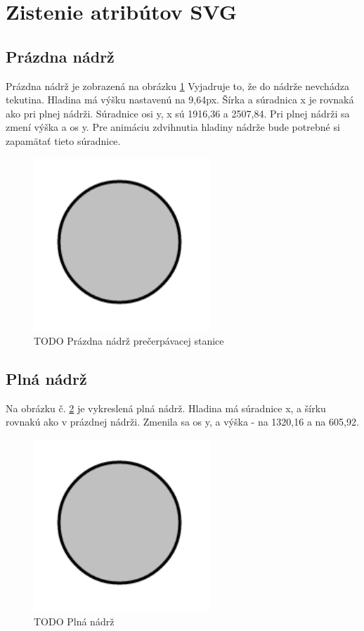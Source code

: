 \section{Zistenie atribútov SVG}

\subsection{Prázdna nádrž}
Prázdna nádrž je zobrazená na obrázku \ref{picture6}
Vyjadruje to, že do nádrže nevchádza tekutina. Hladina má výšku nastavenú na 9,64px. Šírka a súradnica x je rovnaká ako pri plnej nádrži. Súradnice osi y, x sú 1916,36 a 2507,84. Pri plnej nádrži sa zmení výška a os y. Pre animáciu zdvihnutia hladiny nádrže bude potrebné si zapamätať tieto súradnice. 
\begin{figure}[H]
	\begin{center}
		\includegraphics [height=6.5cm]  {obrazky/jednoduchyKruh.png}
		\caption{TODO Prázdna nádrž prečerpávacej stanice}
		\label{picture6}
	\end{center}
\end{figure}

\subsection{Plná nádrž}
Na obrázku č. \ref{picture5} je vykreslená plná nádrž. Hladina má súradnice x, a šírku rovnakú ako v prázdnej nádrži. Zmenila sa os y, a výška - na 1320,16 a na 605,92. 

\begin{figure}[H]
	\begin{center}
		\includegraphics [height=6.5cm]  {obrazky/jednoduchyKruh.png}
		\caption{TODO Plná nádrž}
		\label{picture5}
	\end{center}
\end{figure}

